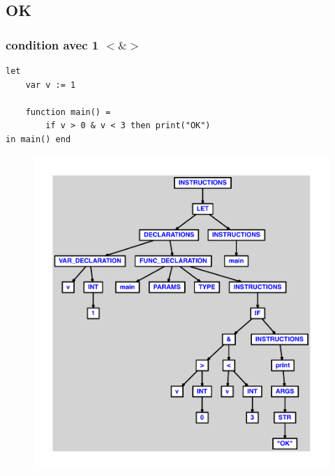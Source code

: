 \documentclass{article}
\begin{document}
\subsection{OK}
\subsubsection{condition avec 1 $ < $$ \& $$ > $}
\begin{lstlisting}
let
	var v := 1

	function main() =
		if v > 0 & v < 3 then print("OK")
in main() end
\end{lstlisting}
\newpage
\begin{figure}[H]
\centering
\includegraphics[max width=\textwidth]{ast/ast_1.pdf}
\end{figure}
\newpage
\end{document}
